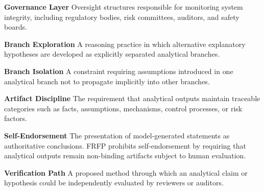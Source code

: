 \textbf{Governance Layer}  
Oversight structures responsible for monitoring system integrity,
including regulatory bodies, risk committees, auditors, and safety boards.

\textbf{Branch Exploration}  
A reasoning practice in which alternative explanatory hypotheses are
developed as explicitly separated analytical branches.

\textbf{Branch Isolation}  
A constraint requiring assumptions introduced in one analytical branch
not to propagate implicitly into other branches.

\textbf{Artifact Discipline}  
The requirement that analytical outputs maintain traceable categories
such as facts, assumptions, mechanisms, control processes, or risk factors.

\textbf{Self-Endorsement}  
The presentation of model-generated statements as authoritative conclusions.
FRFP prohibits self-endorsement by requiring that analytical outputs remain
non-binding artifacts subject to human evaluation.

\textbf{Verification Path}  
A proposed method through which an analytical claim or hypothesis could
be independently evaluated by reviewers or auditors.
